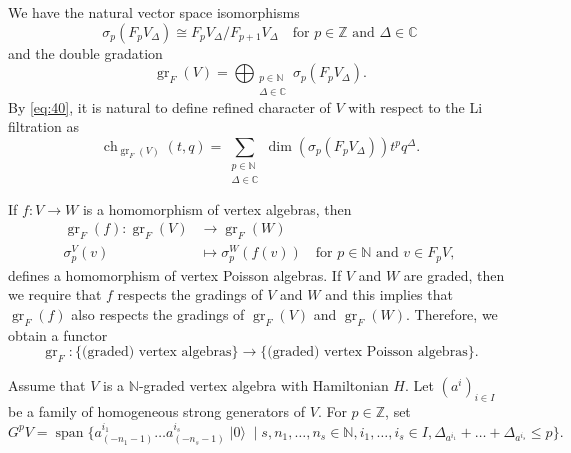 \documentclass[a4paper, 12pt, reqno]{amsart}
\theoremstyle{remark}
\numberwithin{equation}{subsection}
\DeclareMathOperator{\gr}{gr}
\DeclareMathOperator{\ch}{ch}
\DeclareMathOperator{\vspan}{span}
\DeclareMathOperator{\vac}{|0\rangle}
\begin{document}
We have the natural vector space isomorphisms
\begin{equation*}
  \sigma_p(F_pV_{\Delta}) \cong F_pV_{\Delta}/F_{p + 1}V_{\Delta} \quad \text{for }p \in \mathbb{Z}\text{ and }\Delta \in \mathbb{C}
\end{equation*}
and the double gradation
\begin{equation}
  \label{eq:40}
  \gr_F(V) =\bigoplus_{\substack{p \in \mathbb{N} \\ \Delta \in \mathbb{C}}}\sigma_p(F_pV_{\Delta}).
\end{equation}
By \eqref{eq:40}, it is natural to define refined character of $V$ with respect to the Li filtration as
\begin{equation*}
  \ch_{\gr_F(V)}(t, q) = \sum_{\substack{p \in \mathbb{N} \\ \Delta \in \mathbb{C}}}\dim(\sigma_p(F_pV_{\Delta}))t^pq^{\Delta}.
\end{equation*}

If $f: V \to W$ is a homomorphism of vertex algebras, then
\begin{align*}
  \gr_F(f): \gr_F(V) &\to \gr_F(W) \\
  \sigma^V_p(v) &\mapsto \sigma^W_p(f(v)) \quad \text{for }p \in \mathbb{N}\text{ and } v \in F_pV,
\end{align*}
defines a homomorphism of vertex Poisson algebras.
If $V$ and $W$ are graded, then we require that $f$ respects the gradings of $V$ and $W$ and this implies that $\gr_F(f)$ also respects the gradings of $\gr_F(V)$ and $\gr_F(W)$.
Therefore, we obtain a functor
\begin{equation*}
  \gr_F: \{\text{(graded) vertex algebras}\} \to \{\text{(graded) vertex Poisson algebras}\}.
\end{equation*}

Assume that $V$ is a $\mathbb{N}$-graded vertex algebra with Hamiltonian $H$.
Let $(a^i)_{i \in I}$ be a family of homogeneous strong generators of $V$.
For $p \in \mathbb{Z}$, set
\begin{equation*}
  G^pV = \vspan\{a^{i_1}_{(-n_1 - 1)}\dots a^{i_s}_{(-n_s - 1)}\vac \mid s, n_1, \dots, n_s \in \mathbb{N}, i_1, \dots, i_s \in I, \Delta_{a^{i_1}} + \dots + \Delta_{a^{i_s}} \le p\}.
\end{equation*}
\end{document}

